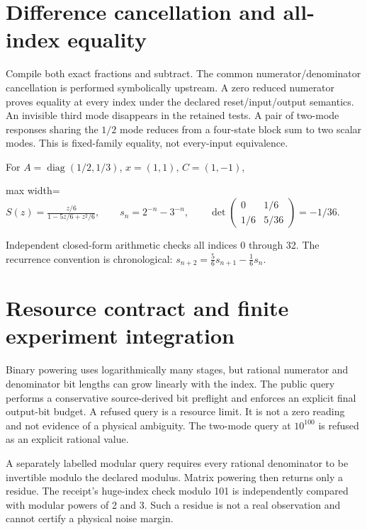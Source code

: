 \documentclass[
  11pt,
  a4paper,
]{report}
\begin{document}
\hypertarget{difference-cancellation-and-all-index-equality}{%
\section{Difference cancellation and all-index
equality}\label{difference-cancellation-and-all-index-equality}}

Compile both exact fractions and subtract. The common
numerator/denominator cancellation is performed symbolically upstream. A
zero reduced numerator proves equality at every index under the declared
reset/input/output semantics. An invisible third mode disappears in the
retained tests. A pair of two-mode responses sharing the \(1/2\) mode
reduces from a four-state block sum to two scalar modes. This is
fixed-family equality, not every-input equivalence.

For \(A=\operatorname{diag}(1/2,1/3)\), \(x=(1,1)\), \(C=(1,-1)\),

\begin{center}
\begin{adjustbox}{max width=\linewidth}
$\displaystyle
S(z)=\frac{z/6}{1-5z/6+z^2/6},\qquad
s_n=2^{-n}-3^{-n},\qquad
\det\begin{pmatrix}0&1/6\\1/6&5/36\end{pmatrix}=-1/36.
$
\end{adjustbox}
\end{center}

Independent closed-form arithmetic checks all indices 0 through 32. The
recurrence convention is chronological:
\(s_{n+2}=\frac56s_{n+1}-\frac16s_n\).

\hypertarget{resource-contract-and-finite-experiment-integration}{%
\section{Resource contract and finite experiment
integration}\label{resource-contract-and-finite-experiment-integration}}

Binary powering uses logarithmically many stages, but rational numerator
and denominator bit lengths can grow linearly with the index. The public
query performs a conservative source-derived bit preflight and enforces
an explicit final output-bit budget. A refused query is a resource
limit. It is not a zero reading and not evidence of a physical
ambiguity. The two-mode query at \(10^{100}\) is refused as an explicit
rational value.

A separately labelled modular query requires every rational denominator
to be invertible modulo the declared modulus. Matrix powering then
returns only a residue. The receipt's huge-index check modulo 101 is
independently compared with modular powers of 2 and 3. Such a residue is
not a real observation and cannot certify a physical noise margin.
\end{document}
